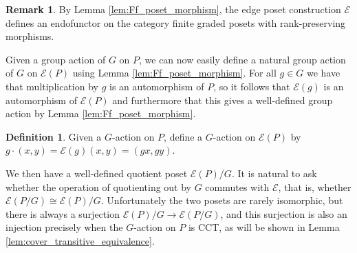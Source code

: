 \documentclass[10 pt]{amsart}
\theoremstyle{plain}
\newtheorem{prop}[thm]{Proposition}
\theoremstyle{definition}
\newtheorem{defn}[thm]{Definition}
\newtheorem{rem}[thm]{Remark}
\theoremstyle{remark}
\numberwithin{equation}{section}
\newcommand{\id}{\mathrm{id}}
\begin{document}
%

\begin{rem}
By Lemma \ref{lem:Ff_poset_morphism}, the edge poset construction $\mathcal{E}$ defines an endofunctor on the category finite graded posets with rank-preserving morphisms.
\end{rem}



Given a group action of $G$ on $P$, we can now easily define a natural group action of $G$ on $\mathcal E(P)$ using Lemma \ref{lem:Ff_poset_morphism}.  For all $g\in G$ we have that multiplication by $g$ is an automorphism of $P$, so it follows that $\mathcal E(g)$ is an automorphism of $\mathcal E(P)$ and furthermore that this gives a well-defined group action by Lemma \ref{lem:Ff_poset_morphism}.

\begin{defn}\label{note:G_action_on_FP}
Given a $G$-action on $P$, define a $G$-action on $\mathcal E(P)$ by $g\cdot (x,y) = \mathcal{E}(g)(x,y) = (gx,gy)$.
\end{defn}

We then have a well-defined quotient poset $\mathcal E(P)/G$.  It is natural to ask whether the operation of quotienting out by $G$ commutes with $\mathcal E$, that is, whether $\mathcal E(P/G) \cong \mathcal E(P)/G$.  Unfortunately the two posets are rarely isomorphic, but there is always a surjection $\mathcal E(P)/G\rightarrow \mathcal E(P/G)$, and this surjection is also an injection precisely when the $G$-action on $P$ is CCT, as will be shown in Lemma \ref{lem:cover_transitive_equivalence}.
\end{document}
